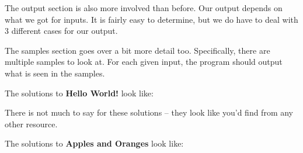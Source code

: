 The output section is also more involved than before. Our output depends on what we got for inputs. It is fairly easy to determine, but we do have to deal with 3 different cases for our output.

The samples section goes over a bit more detail too. Specifically, there are multiple samples to look at. For each given input, the program should output what is seen in the samples.

\hrulefill

The solutions to \textbf{Hello World!} look like:


There is not much to say for these solutions -- they look like you'd find from any other resource.

The solutions to \textbf{Apples and Oranges} look like:

